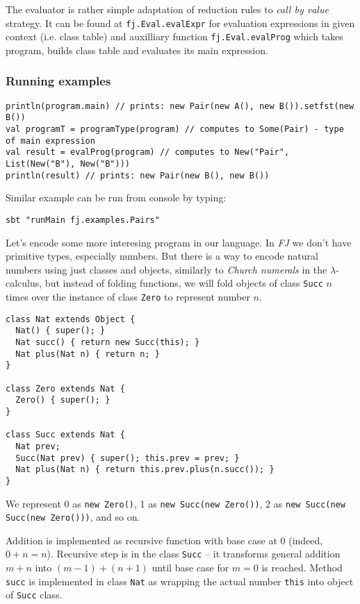 \documentclass{article}[12pt]
\begin{document}
The evaluator is rather simple adaptation of reduction rules to
\emph{call by value} strategy. It can be found at
\texttt{fj.Eval.evalExpr} for evaluation expressions in given
context (i.e. class table) and auxilliary function
\texttt{fj.Eval.evalProg} which takes program, builds class table
and evaluates its main expression.

\subsubsection{Running examples}

\begin{verbatim}
println(program.main) // prints: new Pair(new A(), new B()).setfst(new B())
val programT = programType(program) // computes to Some(Pair) - type of main expression
val result = evalProg(program) // computes to New("Pair", List(New("B"), New("B")))
println(result) // prints: new Pair(new B(), new B())
\end{verbatim}
Similar example can be run from console by typing:

\begin{verbatim}
sbt "runMain fj.examples.Pairs"
\end{verbatim}

Let's encode some more interesing program in our language. In
\emph{FJ} we don't have primitive types, especially numbers.
But there is a way to encode natural numbers using just classes
and objects, similarly to \emph{Church numerals} in
the $\lambda$-calculus, but instead of folding functions, we
will fold objects of class \texttt{Succ} $n$ times over the
instance of class \texttt{Zero} to represent number $n$.

\begin{verbatim}
class Nat extends Object {
  Nat() { super(); }
  Nat succ() { return new Succ(this); }
  Nat plus(Nat n) { return n; }
}

class Zero extends Nat { 
  Zero() { super(); }
}

class Succ extends Nat {
  Nat prev;
  Succ(Nat prev) { super(); this.prev = prev; }
  Nat plus(Nat n) { return this.prev.plus(n.succ()); }
}
\end{verbatim}

We represent 0 as \texttt{new Zero()},
1 as \texttt{new Succ(new Zero())},
2 as \texttt{new Succ(new Succ(new Zero()))}, and so on.

Addition is implemented as recursive function with base case
at 0 (indeed, $0 + n = n$). Recursive step is in the class
\texttt{Succ} -- it transforms general addition $m + n$ into
$(m-1) + (n+1)$ until base case for $m = 0$ is reached.
Method \texttt{succ} is implemented in class \texttt{Nat} as
wrapping the actual number \texttt{this} into object of
\texttt{Succ} class.
\end{document}
